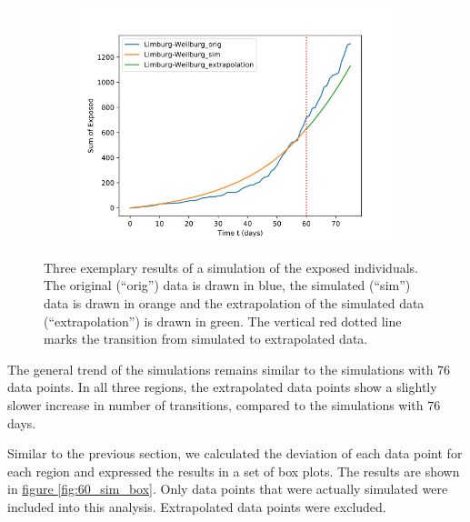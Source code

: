 \begin{figure}[h]
\begin{subfigure}[b]{0.3\textwidth}
		\includegraphics[width=\textwidth]{./figures/60d/10_Limburg-Weilburg.png}	
		\caption{}
	\end{subfigure}
	\caption{Three exemplary results of a simulation of the exposed individuals. The original (``orig'') data is drawn in blue,
		the simulated (``sim'') data is drawn in orange and the extrapolation of the simulated data (``extrapolation'') is
		drawn in green. The vertical red dotted line marks the transition from simulated to extrapolated data.
		}
	\label{fig:60_sim_expl}
\end{figure}

The general trend of the simulations remains similar to the simulations with 76 data points.
In all three regions, the extrapolated data points show a slightly slower increase in number of transitions, compared to the simulations
with 76 days.\newline

Similar to the previous section, we calculated the deviation of each data point for
each region and expressed the results in a set of box plots. The results are shown in \hyperref[fig:60_sim_box]{figure \ref*{fig:60_sim_box}}. Only data points
that were actually simulated were included into this analysis. Extrapolated data points were excluded.\newline

